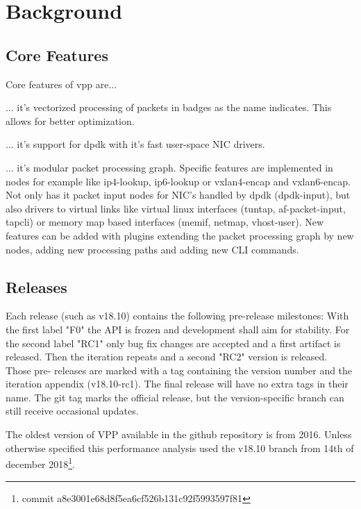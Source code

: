 
\section{Background}

\subsection{Core Features}


Core features of \Ac{vpp} are... 

... it's vectorized processing of packets in badges as the name
indicates. This allows for better optimization.

... it's support for \Ac{dpdk} with it's fast user-space NIC drivers.

... it's modular packet processing graph. Specific features are
implemented in nodes for example like ip4-lookup, ip6-lookup or
vxlan4-encap and vxlan6-encap. Not only has it packet input nodes for
NIC's handled by \Ac{dpdk} (dpdk-input), but also drivers to virtual
links like virtual linux interfaces (tuntap, af-packet-input, tapcli)
or memory map based interfaces (memif, netmap, vhost-user). New
features can be added with plugins extending the packet processing
graph by new nodes, adding new processing paths and adding new CLI
commands. \cite{linguaglossa2017high}


\subsection{Releases}


Each release (such as v18.10) contains the following pre-release
milestones:  With the first label "F0" the API is frozen and
development shall aim for stability. For the second label "RC1" only
bug fix changes are accepted and a first artifact is released. Then
the iteration repeats and a second "RC2" version is released. Those
pre- releases are marked with a tag containing the version number and
the iteration appendix (v18.10-rc1). The final release will have no
extra tags in their name. The git tag marks the official release, but
the version-specific branch can still receive occasional updates.
\cite{vppwiki:releases}

The oldest version of VPP available in the github repository is from
2016. Unless otherwise specified this performance analysis used the
v18.10 branch from 14th of december 2018\footnote{commit
a8e3001e68d8f5ea6cf526b131c92f5993597f81}.


